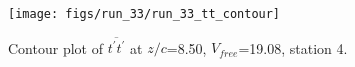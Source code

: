 \begin{figure}[H]
\centering
\texttt{[image: figs/run\_33/run\_33\_tt\_contour]}
\caption{Contour plot of $\overline{t^\prime t^\prime}$ at $z/c$=8.50, $V_{free}$=19.08, station 4.}
\label{fig:run_33_tt_contour}
\end{figure}



